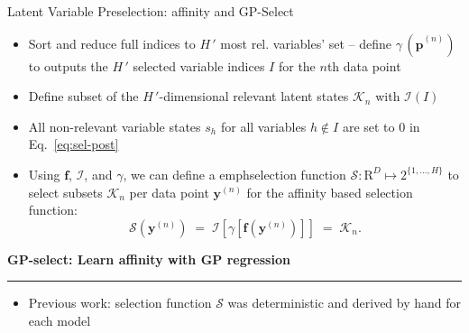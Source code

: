 \documentclass[final]{beamer}
\renewcommand{\vec}[1]{{\mathbf{#1}}}
\newcommand{\highlight}[1]{\textcolor{blocktbgn}{#1}}
\newcommand{\subhead}[1]{ \centering \textbf{#1}                                                                                                                                                                 \vskip-1.7\baselineskip~\\
\rule{\linewidth}{1pt}
\vspace{-0.9cm}
}
\renewcommand{\vec}[1]{{\mathbf{#1}}}
\newcommand{\Kn}{\mathcal{K}_{n}}
\begin{document}
\begin{frame}{}
\begin{columns}[t]
\begin{column}{.35\linewidth}
\begin{block}{Latent Variable Preselection: affinity and GP-Select}
\begin{itemize}
            \item \highlight{Sort and reduce} full indices to $H\,'$ most rel. variables' set -- define 
                  \highlight{$\gamma\,(\hat{\vec{p}}^{(n)})$} to outputs the \highlight{$H\,'$ selected variable indices $I$} for the $n$th data point
            \item \highlight{Define subset} of the $H\,'$-dimensional \highlight{relevant latent states $\Kn$} with \highlight{$\mathcal{I}(I)$} 
            \item All \highlight{non-relevant variable states} $s_h$ for all variables $h\not\in I$ are \highlight{set to $0$} in Eq.~\eqref{eq:sel-post} 
            \item Using $\vec{f}$, $\mathcal{I}$, and $\gamma$, we can define a 
            \highlight{emph{selection function}} $\mathcal{S}: \mathrm{R}^D \mapsto 2^{ \{1,\dots,H \}}$ 
            to \highlight{select subsets $\mathcal{K}_n$} per data point $\vec{y}^{(n)}$ for
            the \highlight{affinity based selection function}:
            \vspace{.1cm}
            \begin{equation}\label{eq:sel-func}
            \mathcal{S}(\vec{y}^{(n)}) \;=\; \mathcal{I} \left[  \gamma \left[ \vec{f}(\vec{y}^{(n)}) \right]  \right] \;=\; \mathcal{K}_n.
            \end{equation}
        \end{itemize}

      \vspace{.25cm}
      \subhead{GP-select: Learn affinity with GP regression}    
        \vspace{-.2cm}
           \begin{itemize}
            \setlength{\labelsep}{0.5em}

            \item Previous work: selection function $\mathcal{S}$ was deterministic and derived by hand for each model 


\end{itemize}
\end{block}
\end{column}
\end{columns}
\end{frame}
\end{document}
